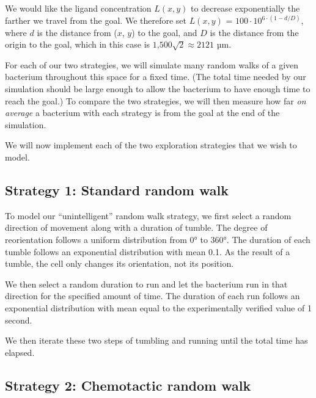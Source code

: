 We would like the ligand concentration $L(x,y)$ to decrease exponentially the farther we travel from the goal. We therefore set $L(x,y)$ = $100 \cdot 10^{6 \cdot (1-d/D)}$, where $d$ is the distance from ($x$, $y$) to the goal, and $D$ is the distance from the origin to the goal, which in this case is $\text{1,500}\sqrt{2} \approx 2121$ µm.\\

\begin{qbox}\end{qbox}

For each of our two strategies, we will simulate many random walks of a given bacterium throughout this space for a fixed time. (The total time needed by our simulation should be large enough to allow the bacterium to have enough time to reach the goal.) To compare the two strategies, we will then measure how far \textit{on average} a bacterium with each strategy is from the goal at the end of the simulation.

We will now implement each of the two exploration strategies that we wish to model.\\

\FloatBarrier
{}
\subsection{Strategy 1: Standard random walk}

To model our ``unintelligent'' random walk strategy, we first select a random direction of movement along with a duration of tumble. The degree of reorientation follows a uniform distribution from 0° to 360°. The duration of each tumble follows an exponential distribution with mean 0.1. As the result of a tumble, the cell only changes its orientation, not its position.

We then select a random duration to run and let the bacterium run in that direction for the specified amount of time. The duration of each run follows an exponential distribution with mean equal to the experimentally verified value of 1 second.

We then iterate these two steps of tumbling and running until the total time has elapsed.

\FloatBarrier
{}
\subsection{Strategy 2: Chemotactic random walk}


